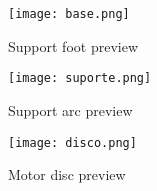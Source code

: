 \begin{figure}[htp]
	\centering
	\texttt{[image: base.png]}
	\caption{Support foot preview}
	\label{fig:support_base}
\end{figure}
\begin{figure}[htp]
	\centering
	\texttt{[image: suporte.png]}
	\caption{Support arc preview}
	\label{fig:support_arc}
\end{figure}
\begin{figure}[htp]
	\centering
	\texttt{[image: disco.png]}
	\caption{Motor disc preview}
	\label{fig:support_disc}
\end{figure}

